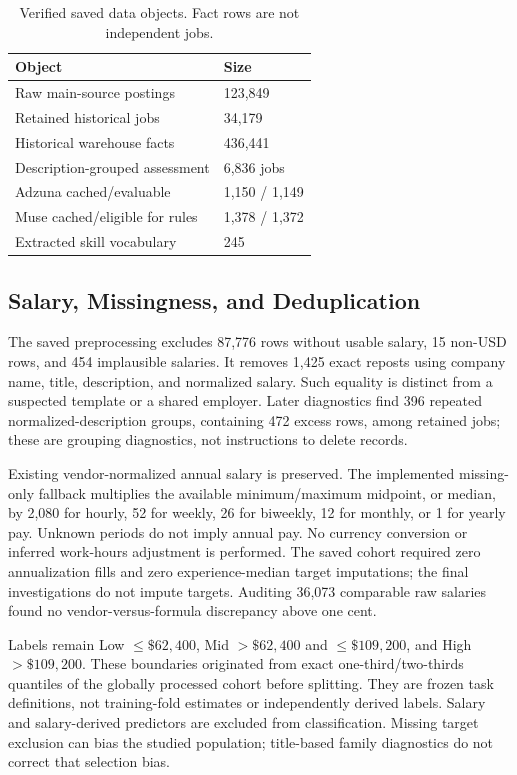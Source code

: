 \documentclass[sigconf,nonacm]{acmart}
\begin{document}
\begin{table}[t]
\caption{Verified saved data objects. Fact rows are not independent jobs.}
\label{tab:data-summary}
\centering\small
\begin{tabular}{p{}p{}}
\toprule
Object & Size \\
\midrule
Raw main-source postings & 123,849 \\
Retained historical jobs & 34,179 \\
Historical warehouse facts & 436,441 \\
Description-grouped assessment & 6,836 jobs \\
Adzuna cached/evaluable & 1,150 / 1,149 \\
Muse cached/eligible for rules & 1,378 / 1,372 \\
Extracted skill vocabulary & 245 \\
\bottomrule
\end{tabular}
\end{table}

\subsection{Salary, Missingness, and Deduplication}
The saved preprocessing excludes 87,776 rows without usable salary, 15 non-USD rows, and 454 implausible salaries. It removes 1,425 exact reposts using company name, title, description, and normalized salary. Such equality is distinct from a suspected template or a shared employer. Later diagnostics find 396 repeated normalized-description groups, containing 472 excess rows, among retained jobs; these are grouping diagnostics, not instructions to delete records.

Existing vendor-normalized annual salary is preserved. The implemented missing-only fallback multiplies the available minimum/maximum midpoint, or median, by 2,080 for hourly, 52 for weekly, 26 for biweekly, 12 for monthly, or 1 for yearly pay. Unknown periods do not imply annual pay. No currency conversion or inferred work-hours adjustment is performed. The saved cohort required zero annualization fills and zero experience-median target imputations; the final investigations do not impute targets. Auditing 36,073 comparable raw salaries found no vendor-versus-formula discrepancy above one cent.

Labels remain Low $\leq\$62,400$, Mid $>\$62,400$ and $\leq\$109,200$, and High $>\$109,200$. These boundaries originated from exact one-third/two-thirds quantiles of the globally processed cohort before splitting. They are frozen task definitions, not training-fold estimates or independently derived labels. Salary and salary-derived predictors are excluded from classification. Missing target exclusion can bias the studied population; title-based family diagnostics do not correct that selection bias.
\end{document}
